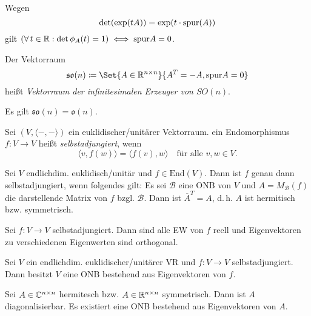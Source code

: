 \documentclass{cheat-sheet}
\newcommand{\End}{\mathrm{End}}
\newcommand{\BB}{\mathcal{B}}
\begin{document}
\begin{bem}
Wegen
\[ \det(\exp(tA)) = \exp(t \cdot \mathrm{spur}(A)) \]
gilt $(\forall\,t \in \mathbb{R} : \det \phi_A(t) = 1) \iff \mathrm{spur} A = 0$.
\end{bem}

\begin{defn}
Der Vektorraum
\[ \mathfrak{so}(n) \coloneqq \Set{ A \in \R^{n \times n} }{ A^T = - A, \spur A = 0 } \]
heißt \emph{Vektorraum der infinitesimalen Erzeuger von $SO(n)$}.
\end{defn}

\begin{satz}
Es gilt $\mathfrak{so}(n) = \mathfrak{o}(n)$.
\end{satz}



\begin{defn}
Sei $(V, \langle - , - \rangle)$ ein euklidischer/unitärer Vektorraum. ein Endomorphismus $f : V \to V$ heißt \emph{selbstadjungiert}, wenn
\[ \langle v, f(w) \rangle = \langle f(v), w \rangle \quad \text{für alle $v, w \in V$.} \]
\end{defn}


\begin{satz}
Sei $V$ endlichdim. euklidisch/unitär und $f \in \End(V)$. Dann ist $f$ genau dann selbstadjungiert, wenn folgendes gilt: Es sei $\BB$ eine ONB von $V$ und $A = M_\BB(f)$ die darstellende Matrix von $f$ bzgl. $\BB$. Dann ist $\overline{A}^T = A$, d.\,h. $A$ ist hermitisch bzw. symmetrisch.
\end{satz}

\begin{satz}
Sei $f : V \to V$ selbstadjungiert. Dann sind alle EW von $f$ reell und Eigenvektoren zu verschiedenen Eigenwerten sind orthogonal.
\end{satz}

\begin{satz}
Sei $V$ ein endlichdim. euklidischer/unitärer VR und $f : V \to V$ selbstadjungiert. Dann besitzt $V$ eine ONB bestehend aus Eigenvektoren von $f$.
\end{satz}

\begin{kor}
Sei $A \in \mathbb{C}^{n \times n}$ hermitesch bzw. $A \in \mathbb{R}^{n \times n}$ symmetrisch. Dann ist $A$ diagonalisierbar. Es existiert eine ONB bestehend aus Eigenvektoren von $A$.
\end{kor}
\end{document}
